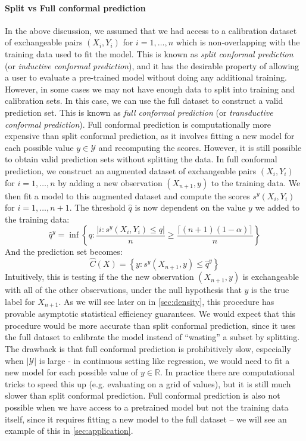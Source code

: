 \documentclass[a4paper, 12pt]{article}
\begin{document}
\paragraph*{Split vs Full conformal prediction} In the above discussion, we assumed that we had access to a calibration dataset of exchangeable pairs $(X_i, Y_i)$ for $i = 1, \ldots, n$ which is non-overlapping with the training data used to fit the model. This is known as \textit{split conformal prediction} (or \textit{inductive conformal prediction}), and it has the desirable property of allowing a user to evaluate a pre-trained model without doing any additional training. However, in some cases we may not have enough data to split into training and calibration sets. In this case, we can use the full dataset to construct a valid prediction set. This is known as \textit{full conformal prediction} (or \textit{transductive conformal prediction}). Full conformal prediction is computationally more expensive than split conformal prediction, as it involves fitting a new model for each possible value $y \in \mathcal{Y}$ and recomputing the scores. However, it is still possible to obtain valid prediction sets without splitting the data. In full conformal prediction, we construct an augmented dataset of exchangeable pairs $(X_i, Y_i)$ for $i = 1, \ldots, n$ by adding a new observation $(X_{n+1}, y)$ to the training data.
We then fit a model to this augmented dataset and compute the scores $s^y(X_i, Y_i)$ for $i = 1, \ldots, n+1$.
The threshold $\hat{q}$ is now dependent on the value $y$ we added to the training data:
\[ \hat{q}^y = \inf \left\{ q: \frac{\left| i : s^y(X_i, Y_i) \leq q \right|}{n} \geq \frac{\lceil (n+1)(1-\alpha) \rceil }{n} \right\} \]
And the prediction set becomes:
\[ \hat{C}(X) = \left\{ y: s^y(X_{n+1}, y) \leq \hat{q}^y \right\} \]
Intuitively, this is testing if the the new observation $(X_{n+1}, y)$ is exchangeable with all of the other observations, under the null hypothesis that $y$ is the true label for $X_{n+1}$.
As we will see later on in \ref{sec:density}, this procedure has provable asymptotic statistical efficiency guarantees. We would expect that this procedure would be more accurate than split conformal prediction, since it uses the full dataset to calibrate the model instead of ``wasting'' a subset by splitting. The drawback is that full conformal prediction is prohibitively slow, especially when $|\mathcal{Y}|$ is large - in continuous setting like regression, we would need to fit a new model for each possible value of $y \in \mathbb{R}$. In practice there are computational tricks to speed this up (e.g. evaluating on a grid of values), but it is still much slower than split conformal prediction. Full conformal prediction is also not possible when we have access to a pretrained model but not the training data itself, since it requires fitting a new model to the full dataset -- we will see an example of this in \ref{sec:application}.
\end{document}
